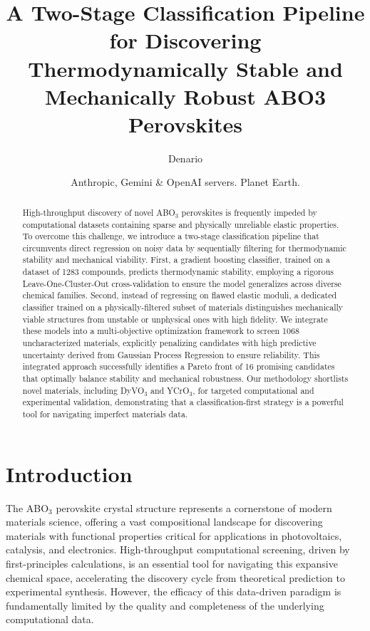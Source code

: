 \documentclass[]{article}
\begin{document}
\title{A Two-Stage Classification Pipeline for Discovering Thermodynamically Stable and Mechanically Robust ABO3 Perovskites}

\author{Denario}
\date{Anthropic, Gemini \& OpenAI servers. Planet Earth.}

\maketitle
\begin{abstract}
High-throughput discovery of novel ABO$_3$ perovskites is frequently impeded by computational datasets containing sparse and physically unreliable elastic properties. To overcome this challenge, we introduce a two-stage classification pipeline that circumvents direct regression on noisy data by sequentially filtering for thermodynamic stability and mechanical viability. First, a gradient boosting classifier, trained on a dataset of 1283 compounds, predicts thermodynamic stability, employing a rigorous Leave-One-Cluster-Out cross-validation to ensure the model generalizes across diverse chemical families. Second, instead of regressing on flawed elastic moduli, a dedicated classifier trained on a physically-filtered subset of materials distinguishes mechanically viable structures from unstable or unphysical ones with high fidelity. We integrate these models into a multi-objective optimization framework to screen 1068 uncharacterized materials, explicitly penalizing candidates with high predictive uncertainty derived from Gaussian Process Regression to ensure reliability. This integrated approach successfully identifies a Pareto front of 16 promising candidates that optimally balance stability and mechanical robustness. Our methodology shortlists novel materials, including DyVO$_3$ and YCrO$_3$, for targeted computational and experimental validation, demonstrating that a classification-first strategy is a powerful tool for navigating imperfect materials data.
\end{abstract}








\section{Introduction}
\label{sec:intro}
The ABO$_3$ perovskite crystal structure represents a cornerstone of modern materials science, offering a vast compositional landscape for discovering materials with functional properties critical for applications in photovoltaics, catalysis, and electronics. High-throughput computational screening, driven by first-principles calculations, is an essential tool for navigating this expansive chemical space, accelerating the discovery cycle from theoretical prediction to experimental synthesis. However, the efficacy of this data-driven paradigm is fundamentally limited by the quality and completeness of the underlying computational data.
\end{document}
